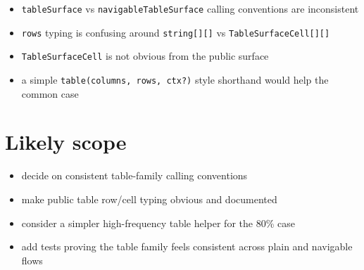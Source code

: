 \begin{itemize}
\tightlist
\item
  \texttt{t\allowbreak{}a\allowbreak{}b\allowbreak{}l\allowbreak{}e\allowbreak{}S\allowbreak{}u\allowbreak{}r\allowbreak{}f\allowbreak{}a\allowbreak{}c\allowbreak{}e} vs \texttt{n\allowbreak{}a\allowbreak{}v\allowbreak{}i\allowbreak{}g\allowbreak{}a\allowbreak{}b\allowbreak{}l\allowbreak{}e\allowbreak{}T\allowbreak{}a\allowbreak{}b\allowbreak{}l\allowbreak{}e\allowbreak{}S\allowbreak{}u\allowbreak{}r\allowbreak{}f\allowbreak{}a\allowbreak{}c\allowbreak{}e} calling conventions are inconsistent
\item
  \texttt{r\allowbreak{}o\allowbreak{}w\allowbreak{}s} typing is confusing around \texttt{s\allowbreak{}t\allowbreak{}r\allowbreak{}i\allowbreak{}n\allowbreak{}g\allowbreak{}[\allowbreak{}]\allowbreak{}[\allowbreak{}]} vs \texttt{T\allowbreak{}a\allowbreak{}b\allowbreak{}l\allowbreak{}e\allowbreak{}S\allowbreak{}u\allowbreak{}r\allowbreak{}f\allowbreak{}a\allowbreak{}c\allowbreak{}e\allowbreak{}C\allowbreak{}e\allowbreak{}l\allowbreak{}l\allowbreak{}[\allowbreak{}]\allowbreak{}[\allowbreak{}]}
\item
  \texttt{T\allowbreak{}a\allowbreak{}b\allowbreak{}l\allowbreak{}e\allowbreak{}S\allowbreak{}u\allowbreak{}r\allowbreak{}f\allowbreak{}a\allowbreak{}c\allowbreak{}e\allowbreak{}C\allowbreak{}e\allowbreak{}l\allowbreak{}l} is not obvious from the public surface
\item
  a simple \texttt{t\allowbreak{}a\allowbreak{}b\allowbreak{}l\allowbreak{}e\allowbreak{}(\allowbreak{}c\allowbreak{}o\allowbreak{}l\allowbreak{}u\allowbreak{}m\allowbreak{}n\allowbreak{}s\allowbreak{},\allowbreak{} \allowbreak{}r\allowbreak{}o\allowbreak{}w\allowbreak{}s\allowbreak{},\allowbreak{} \allowbreak{}c\allowbreak{}t\allowbreak{}x\allowbreak{}?\allowbreak{})} style shorthand would help the common case
\end{itemize}

\section{Likely scope}\label{record-335-likely-scope}

\begin{itemize}
\tightlist
\item
  decide on consistent table-family calling conventions
\item
  make public table row/cell typing obvious and documented
\item
  consider a simpler high-frequency table helper for the 80\% case
\item
  add tests proving the table family feels consistent across plain and navigable flows
\end{itemize}

